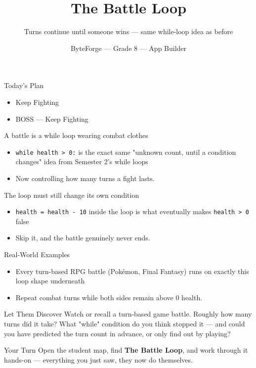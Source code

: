 \documentclass[aspectratio=169]{beamer}
\title{The Battle Loop}
\subtitle{Turns continue until someone wins — same while-loop idea as before}
\author{ByteForge --- Grade 8 --- App Builder}
\date{}
\begin{document}
\begin{frame}
    \titlepage
\end{frame}

\begin{frame}{Today's Plan}
    \begin{itemize}
        \item Keep Fighting
        \item[$\bigstar$] BOSS --- Keep Fighting
    \end{itemize}
\end{frame}

\begin{frame}{A battle is a while loop wearing combat clothes}
    \large
    \begin{itemize}
        \item \texttt{while health > 0:} is the exact same "unknown count, until a condition changes" idea from Semester 2's while loops
        \item Now controlling how many turns a fight lasts.
    \end{itemize}
\end{frame}


\begin{frame}{The loop must still change its own condition}
    \large
    \begin{itemize}
        \item \texttt{health = health - 10} inside the loop is what eventually makes \texttt{health > 0} false
        \item Skip it, and the battle genuinely never ends.
    \end{itemize}
\end{frame}

\begin{frame}{Real-World Examples}
    \large
    \begin{itemize}
        \item Every turn-based RPG battle (Pokémon, Final Fantasy) runs on exactly this loop shape underneath
        \item Repeat combat turns while both sides remain above 0 health.
    \end{itemize}
\end{frame}


\begin{frame}{Let Them Discover}
    \Large
    Watch or recall a turn-based game battle. Roughly how many turns did it take? What "while" condition do you think stopped it — and could you have predicted the turn count in advance, or only find out by playing?
\end{frame}

\begin{frame}{Your Turn}
    \Large
    Open the student map, find \textbf{The Battle Loop}, and work through it
    hands-on --- everything you just saw, they now do themselves.
\end{frame}
\end{document}
